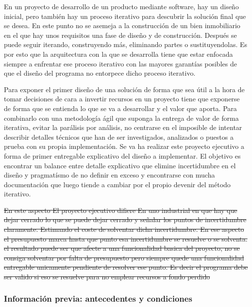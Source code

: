 En un proyecto de desarrollo de un producto mediante software, hay un diseño inicial, pero también hay un proceso iterativo para descubrir la solución final que se desea. En este punto no se asemeja a la construcción de un bien inmobiliario en el que hay unos requisitos una fase de diseño y de construcción. Después se puede seguir iterando, construyendo más, eliminando partes o sustituyendolas. Es por esto que la arquitectura con la que se desarrolla tiene que estar enfocada siempre a enfrentar ese proceso iterativo con las mayores garantías posibles de que el diseño del programa no entorpece dicho proceso iterativo.

Para exponer el primer diseño de una solución de forma que sea útil a la hora de tomar decisiones de cara a invertir recursos en un proyecto tiene que exponerse de forma que se entienda lo que se va a desarrollar y el valor que aporta. Para combinarlo con una metodología ágil que suponga la entrega de valor de forma iterativa, evitar la parálisis por análisis, no centrarse en el imposible de intentar describir detalles técnicos que han de ser investigados, analizados o puestos a prueba con su propia implementación. Se va ha realizar este proyecto ejecutivo a forma de primer entregable explicativo del diseño a implementar. El objetivo es encontrar un balance entre detalle explicativo que elimine incertidumbre en el diseño y pragmatísmo de no definir en exceso y encontrarse con mucha documentación que luego tiende a cambiar por el propio devenir del método iterativo.

\sout{En este aspecto El proyecto ejecutivo difiere En uno industrial en que hay que dejar cerrado lo que se puede dejar cerrado y señalar los puntos de incertidumbre claramente. Estimando el coste de solventar dicha incertidumbre. En ese aspecto el presupuesto marca hasta que punto esa incertidumbre se resuelve o se solventa. el resultado puede ser que afecte a una funcionalidad basica del proyecto, no se consiga solventar por falta de presupuesto pero siempre quede una funcionalidad entregable unicamente pendiente de resolver ese punto. Es decir el programa debe ser valido si eso se resuelve para no emplear recursos a fondo perdido}

\subsubsection{Información previa: antecedentes y condiciones}
    
